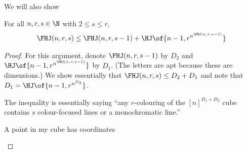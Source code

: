 We will also show
\begin{boxlemma} \label{Ch6:Lemma:FHJ_Recursion}
    For all $n, r, s \in \N$ with $2 \leq s \leq r$,
    \begin{align*}
        \FHJ(n, r, s) \le \FHJ(n, r, s - 1) + \HJ\of{n - 1, r^{n^{\FHJ(n, r, s - 1)}}}
    \end{align*}
\end{boxlemma}
\begin{proof}
For this argument, denote $\FHJ(n, r, s - 1)$ by $D_2$ and $\HJ\of{n - 1, r^{n^{\FHJ(n, r, s - 1)}}}$ by $D_1$. (The letters are apt because these are dimensions.) We show essentially that $\FHJ(n, r, s) \le D_2 + D_1$ and note that $D_1 = \HJ\of{n - 1, r^{n^{D_2}}}$.

The inequality is essentially saying ``any $r$-colouring of the $[n]^{D_1 + D_2}$ cube contains $s$ colour-focused lines or a monochromatic line.''

A point in my cube has coordinates

\begin{figure}[H]
    \centering
\end{figure}


\end{proof}
